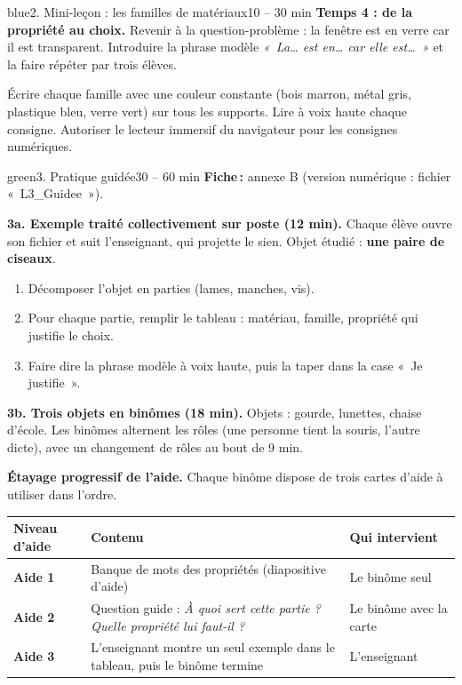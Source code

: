 \documentclass[11pt,a4paper]{article}
\begin{document}
\begin{etape}{blue}{2. Mini-leçon : les familles de matériaux}{10 -- 30 min}
\textbf{Temps 4 : de la propriété au choix.} Revenir à la question-problème : la fenêtre est en verre car il est transparent. Introduire la phrase modèle \textit{«~La\ldots{} est en\ldots{} car elle est\ldots~»} et la faire répéter par trois élèves.

\begin{astuce}
Écrire chaque famille avec une couleur constante (bois marron, métal gris, plastique bleu, verre vert) sur tous les supports. Lire à voix haute chaque consigne. Autoriser le lecteur immersif du navigateur pour les consignes numériques.
\end{astuce}
\end{etape}

\begin{etape}{green}{3. Pratique guidée}{30 -- 60 min}
\textbf{Fiche\,:} annexe B (version numérique : fichier «~L3\_Guidee~»).

\medskip
\textbf{3a. Exemple traité collectivement sur poste (12 min).} Chaque élève ouvre son fichier et suit l'enseignant, qui projette le sien. Objet étudié : \textbf{une paire de ciseaux}.
\begin{enumerate}
 \item Décomposer l'objet en parties (lames, manches, vis).
 \item Pour chaque partie, remplir le tableau : matériau, famille, propriété qui justifie le choix.
 \item Faire dire la phrase modèle à voix haute, puis la taper dans la case «~Je justifie~».
\end{enumerate}

\textbf{3b. Trois objets en binômes (18 min).} Objets : gourde, lunettes, chaise d'école. Les binômes alternent les rôles (une personne tient la souris, l'autre dicte), avec un changement de rôles au bout de 9 min.

\textbf{Étayage progressif de l'aide.} Chaque binôme dispose de trois cartes d'aide à utiliser dans l'ordre.

\begin{center}
\begin{tabularx}{\linewidth}{>{\bfseries}p{2.4cm}Y p{4.6cm}}
\toprule
Niveau d'aide & Contenu & Qui intervient\\
\midrule
Aide 1 & Banque de mots des propriétés (diapositive d'aide) & Le binôme seul\\
Aide 2 & Question guide : \emph{À quoi sert cette partie ? Quelle propriété lui faut-il ?} & Le binôme avec la carte\\
Aide 3 & L'enseignant montre un seul exemple dans le tableau, puis le binôme termine & L'enseignant\\
\bottomrule
\end{tabularx}
\end{center}


\end{etape}
\end{document}
